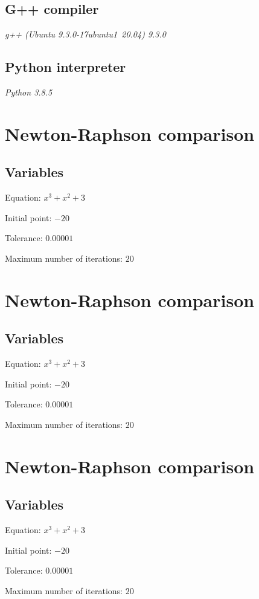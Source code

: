 \documentclass[conference]{IEEEtran}
\begin{document}
\subsection{G++ compiler}
\textit{g++ (Ubuntu 9.3.0-17ubuntu1~20.04) 9.3.0}

\subsection{Python interpreter}
\textit{Python 3.8.5}

\section{Newton-Raphson comparison}
\subsection{Variables}

Equation: \(x^3 + x^2 + 3\) 

Initial point: \(-20\)

Tolerance: \(0.00001\) 

Maximum number of iterations: \(20\)

\section{Newton-Raphson comparison}
\subsection{Variables}

Equation: \(x^3 + x^2 + 3\) 

Initial point: \(-20\)

Tolerance: \(0.00001\) 

Maximum number of iterations: \(20\)

\section{Newton-Raphson comparison}
\subsection{Variables}

Equation: \(x^3 + x^2 + 3\) 

Initial point: \(-20\)

Tolerance: \(0.00001\) 

Maximum number of iterations: \(20\)
\end{document}
